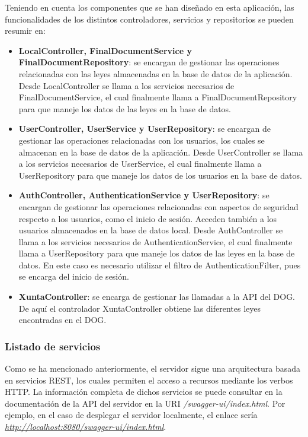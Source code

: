 Teniendo en cuenta los componentes que se han diseñado en esta aplicación, las funcionalidades de los distintos controladores, servicios y repositorios se pueden resumir en:
\begin{itemize}
    \item {\bf LocalController, FinalDocumentService y FinalDocumentRepository}: se encargan de gestionar las operaciones relacionadas con las leyes almacenadas en la base de datos de la aplicación. Desde LocalController se llama a los servicios necesarios de FinalDocumentService, el cual finalmente llama a FinalDocumentRepository para que maneje los datos de las leyes en la base de datos.
    \item {\bf UserController, UserService y UserRepository}: se encargan de gestionar las operaciones relacionadas con los usuarios, los cuales se almacenan en la base de datos de la aplicación. Desde UserController se llama a los servicios necesarios de UserService, el cual finalmente llama a UserRepository para que maneje los datos de los usuarios en la base de datos.
    \item {\bf AuthController, AuthenticationService y UserRepository}: se encargan de gestionar las operaciones relacionadas con aspectos de seguridad respecto a los usuarios, como el inicio de sesión. Acceden también a los usuarios almacenados en la base de datos local. Desde AuthController se llama a los servicios necesarios de AuthenticationService, el cual finalmente llama a UserRepository para que maneje los datos de las leyes en la base de datos. En este caso es necesario utilizar el filtro de AuthenticationFilter, pues se encarga del inicio de sesión.
    \item {\bf XuntaController}: se encarga de gestionar las llamadas a la API del DOG. De aquí el controlador XuntaController obtiene las diferentes leyes encontradas en el DOG.
\end{itemize}

\subsubsection{Listado de servicios}

Como se ha mencionado anteriormente, el servidor sigue una arquitectura basada en servicios REST, los cuales permiten el acceso a recursos mediante los verbos HTTP. La información completa de dichos servicios se puede consultar en la documentación de la API del servidor en la URI {\it /swagger-ui/index.html}. Por ejemplo, en el caso de desplegar el servidor localmente, el enlace sería {\it \url{http://localhost:8080/swagger-ui/index.html}}.

